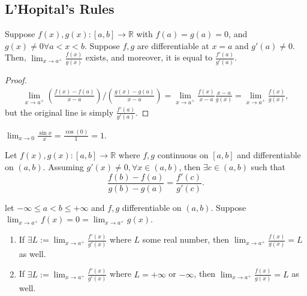 \subsection{L'Hopital's Rules}

\begin{proposition}
    Suppose $f(x), g(x) : [a, b] \to \mathbb{R}$ with $f(a) = g(a) = 0$, and $g(x) \neq 0 \forall a < x < b$. Suppose $f, g$ are differentiable at $x=a$ and $g'(a) \neq 0$. Then, $\lim_{x \to a^+} \frac{f(x)}{g(x)}$ exists, and moreover, it is equal to $\frac{f'(a)}{g'(a)}$.
\end{proposition}

\begin{proof}
    \begin{align*}
        \lim_{x \to a^+} (\frac{f(x) - f(a)}{x-a}) / (\frac{g(x) - g(a)}{x-a}) = \lim_{x \to a^+} \frac{f(x)}{x-a} \frac{x-a}{g(x)} = \lim_{x \to a^+} \frac{f(x)}{g(x)},
    \end{align*}
    but the original line is simply $\frac{f'(a)}{g'(a)}$.
\end{proof}

\begin{example}
    $\lim_{x \to 0} \frac{\sin x}{x} = \frac{\cos(0)}{1} = 1.$
\end{example}

\begin{theorem}
    Let $f(x), g(x) : [a, b] \to \mathbb{R}$ where $f, g$ continuous on $[a, b]$ and differentiable on $(a, b)$. Assuming $g'(x) \neq 0, \forall x \in (a,b)$, then $\exists c \in (a, b)$ such that \[
    \frac{f(b) - f(a)}{g(b) - g(a)} = \frac{f'(c)}{g'(c)}    .
    \]
\end{theorem}

\begin{proposition}
    let $-\infty \leq a < b \leq + \infty$ and $f, g$ differentiable on $(a,b)$. Suppose $\lim_{x \to a^+}f(x) = 0 = \lim_{x \to a^+} g(x)$. \begin{enumerate}
        \item If $\exists L := \lim_{x \to a^+} \frac{f'(x)}{g'(x)}$ where $L$ some real number, then $\lim_{x \to a^+} \frac{f(x)}{g(x)} = L$ as well.
        \item If $\exists L := \lim_{x \to a^+} \frac{f'(x)}{g'(x)}$ where $L = + \infty$ or $-\infty$, then $\lim_{x \to a^+} \frac{f(x)}{g(x)} = L$ as well.
    \end{enumerate}
\end{proposition}

